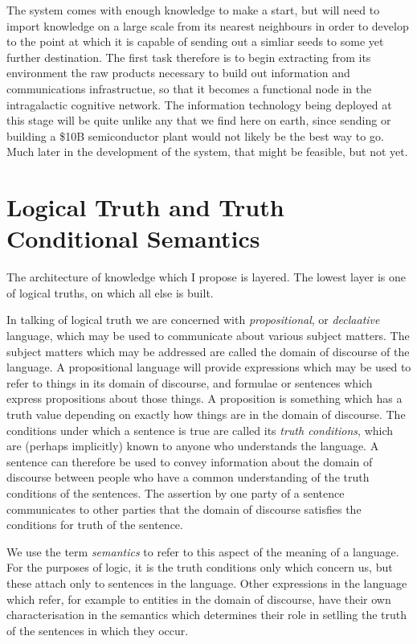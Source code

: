 \documentclass[10pt,titlepage]{book}
\begin{document}
The system comes with enough knowledge to make a start, but will need to import knowledge on a large scale from its nearest neighbours in order to develop to the point at which it is capable of sending out a simliar seeds to some yet further destination.
The first task therefore is to begin extracting from its environment the raw products necessary to build out information and communications infrastructue, so that it becomes a functional node in the intragalactic cognitive network.
The information technology being deployed at this stage will be quite unlike any that we find here on earth, since sending or building a \$10B semiconductor plant would not likely be the best way to go.
Much later in the development of the system, that might be feasible, but not yet.

\section{Logical Truth and Truth Conditional Semantics}

The architecture of knowledge which I propose is layered.
The lowest layer is one of logical truths, on which all else is built.

In talking of logical truth we are concerned with \emph{propositional}, or \emph{declaative} language, which may be used to communicate about various subject matters.
The subject matters which may be addressed are called the domain of discourse of the language.
A propositional language will provide expressions which may be used to refer to things in its domain of discourse, and formulae or sentences which express propositions about those things.
A proposition is something which has a truth value depending on exactly how things are in the domain of discourse.
The conditions under which a sentence is true are called its \emph{truth conditions}, which are (perhaps implicitly) known to anyone who understands the language.
A sentence can therefore be used to convey information about the domain of discourse between people who have a common understanding of the truth conditions of the sentences.
The assertion by one party of a sentence communicates to other parties that the domain of discourse satisfies the conditions for truth of the sentence.

We use the term \emph{semantics} to refer to this aspect of the meaning of a language.
For the purposes of logic, it is the truth conditions only which concern us, but these attach only to sentences in the language.
Other expressions in the language which refer, for example to entities in the domain of discourse, have their own characterisation in the semantics which determines their role in setlling the truth of the sentences in which they occur.
\end{document}
